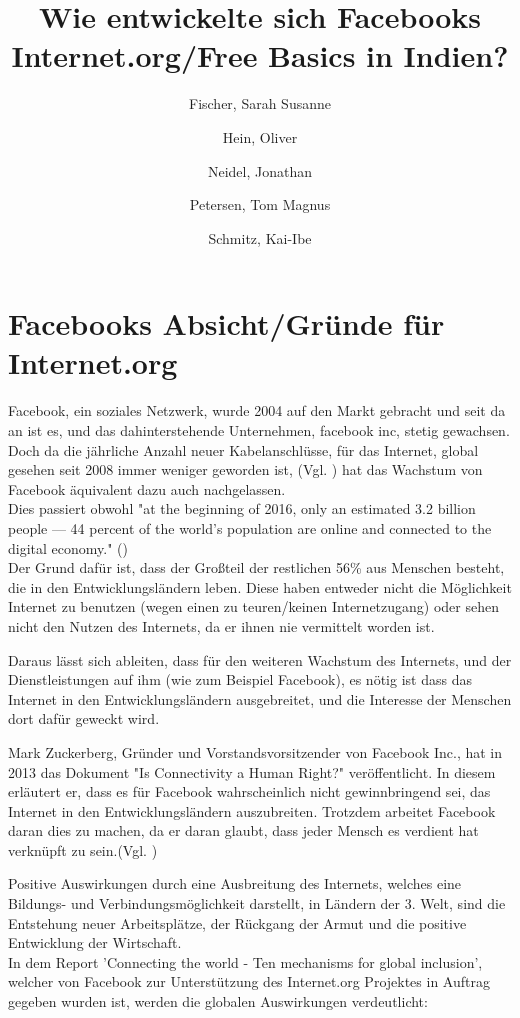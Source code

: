 \documentclass{article}
\title{Wie entwickelte sich Facebooks Internet.org/Free Basics in Indien?}
\author{
  Fischer, Sarah Susanne\\
  \and
  Hein, Oliver\\
  \and
  Neidel, Jonathan\\
  \and
  Petersen, Tom Magnus\\
  \and
  Schmitz, Kai-Ibe\\
}
\begin{document}
\section{Facebooks Absicht/Gründe für Internet.org}
Facebook, ein soziales Netzwerk, wurde 2004 auf den Markt gebracht und seit da an ist es, und das dahinterstehende Unternehmen, facebook inc, stetig gewachsen. 
Doch da die jährliche Anzahl neuer Kabelanschlüsse, für das Internet, global gesehen seit 2008 immer weniger geworden ist,
(Vgl. \cite{ICTslowingDown}) hat das Wachstum von Facebook äquivalent dazu auch nachgelassen.\\
Dies passiert obwohl "at the beginning of 2016, only an estimated 3.2 billion people — 44 percent of the world’s population are online and connected to the digital economy." (\cite{connectWorld})\\
Der Grund dafür ist, dass der Großteil der restlichen 56\% aus Menschen besteht, die in den Entwicklungsländern leben. Diese haben entweder nicht die Möglichkeit Internet zu benutzen (wegen einen zu teuren/keinen Internetzugang) oder sehen nicht den Nutzen des Internets, da er ihnen nie vermittelt worden ist.

\medskip

Daraus lässt sich ableiten, dass für den weiteren Wachstum des Internets, und der Dienstleistungen auf ihm (wie zum Beispiel Facebook), es nötig ist dass das Internet in den Entwicklungsländern ausgebreitet, und die Interesse der Menschen dort dafür geweckt wird. 

\medskip

Mark Zuckerberg, Gründer und Vorstandsvorsitzender von Facebook Inc., hat in 2013 das Dokument "Is Connectivity a Human Right?" veröffentlicht.
In diesem erläutert er, dass es für Facebook wahrscheinlich nicht gewinnbringend sei, das Internet in den Entwicklungsländern auszubreiten. Trotzdem arbeitet Facebook daran dies zu machen, da er daran glaubt, dass jeder Mensch es verdient hat verknüpft zu sein.(Vgl. \cite{HumanRight})

\medskip

Positive Auswirkungen durch eine Ausbreitung des Internets, welches eine Bildungs- und Verbindungsmöglichkeit darstellt, in Ländern der 3. Welt, sind die Entstehung neuer Arbeitsplätze, der Rückgang der Armut und die positive Entwicklung der Wirtschaft.\\
    
In dem Report 'Connecting the world - Ten mechanisms for global inclusion', welcher von Facebook zur Unterstützung des Internet.org Projektes in Auftrag gegeben wurden ist, werden die globalen Auswirkungen verdeutlicht:
                    
\end{document}
